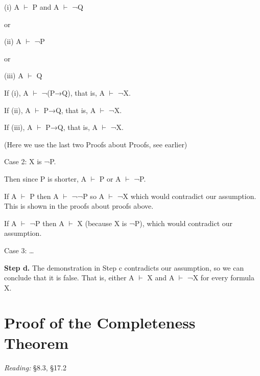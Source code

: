 \documentclass[12pt]{extarticle}
\begin{document}
\begin{multicols*}{3}
\hspace{5mm} (i) A $\vdash$ P and A $\vdash$ ¬Q
 
\hspace{5mm} or
 
\hspace{5mm} (ii) A $\vdash$ ¬P
 
\hspace{5mm} or
 
\hspace{5mm} (iii) A $\vdash$ Q
 
\hspace{5mm} If (i), A $\vdash$ ¬(P→Q), that is, A $\vdash$ ¬X.
 
\hspace{5mm} If (ii), A $\vdash$ P→Q, that is, A $\vdash$ ¬X.
 
\hspace{5mm} If (iii), A $\vdash$ P→Q, that is, A $\vdash$ ¬X.
 
\hspace{5mm} (Here we use the last two Proofs about Proofs, see earlier)
 
Case 2: X is ¬P.
 
\hspace{5mm} Then since P is shorter, A $\vdash$ P or A $\vdash$ ¬P.
 
\hspace{5mm} If A $\vdash$ P then A $\vdash$ ¬¬P so A $\vdash$ ¬X which would contradict our assumption. This is shown in the proofs about proofs above.
 
\hspace{5mm} If A $\vdash$ ¬P then A $\vdash$ X (because X is ¬P), which would contradict our assumption.
 
Case 3: …
 
\textbf{Step d.} The demonstration in Step c contradicts our assumption, so we can conclude that it is false. That is, either A $\vdash$ X and A $\vdash$ ¬X for every formula X.
 
 
 
\section{Proof of the Completeness Theorem}
 
\emph{Reading:} §8.3, §17.2
 

\end{multicols*}
\end{document}
